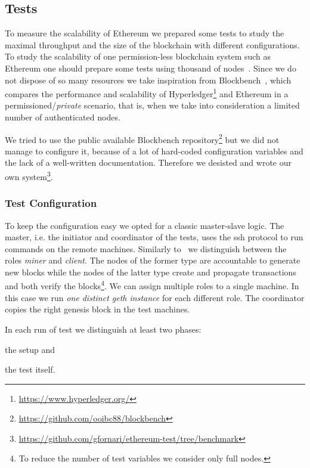 \subsection{Tests}
\label{sec:tests}

To measure the scalability of Ethereum we prepared some tests to study the
maximal throughput and the size of the blockchain with different configurations.
To study the scalability of one permission-less blockchain system such as
Ethereum one should prepare some tests using thousand of
nodes~\cite{bib:securityAndScalabilityPoW, bib:algorand}. Since we do not
dispose of so many resources we take inspiration from
Blockbench~\cite{blockbench}, which compares the performance and scalability of
Hyperledger\footnote{\url{https://www.hyperledger.org/}} and Ethereum in a
permissioned/\emph{private} scenario, that is, when we take into consideration
a limited number of authenticated nodes.

We tried to use the public available Blockbench
repository\footnote{\url{https://github.com/ooibc88/blockbench}} but we did not
manage to configure it, because of a lot of hard-coded configuration variables
and the lack of a well-written documentation. Therefore we desisted and wrote
our own
system\footnote{\url{https://github.com/gfornari/ethereum-test/tree/benchmark}}.


\subsubsection{Test Configuration}

To keep the configuration easy we opted for a classic master-slave logic. The
master, i.e. the initiator and coordinator of the tests, uses the ssh protocol
to run commands on the remote machines. Similarly to~\cite{blockbench} we
distinguish between the roles \emph{miner} and \emph{client}. The nodes of the
former type are accountable to generate new blocks while the nodes of the latter
type create and propagate transactions and both verify the blocks\footnote{To
reduce the number of test variables we consider only full nodes.}. We can assign
multiple roles to a single machine. In this case we run \emph{one distinct geth
instance} for each different role. The coordinator copies the right genesis
block in the test machines.

In each run of test we distinguish at least two phases:
\begin{enumerate*}
  \item the setup and
  \item the test itself.
\end{enumerate*}

